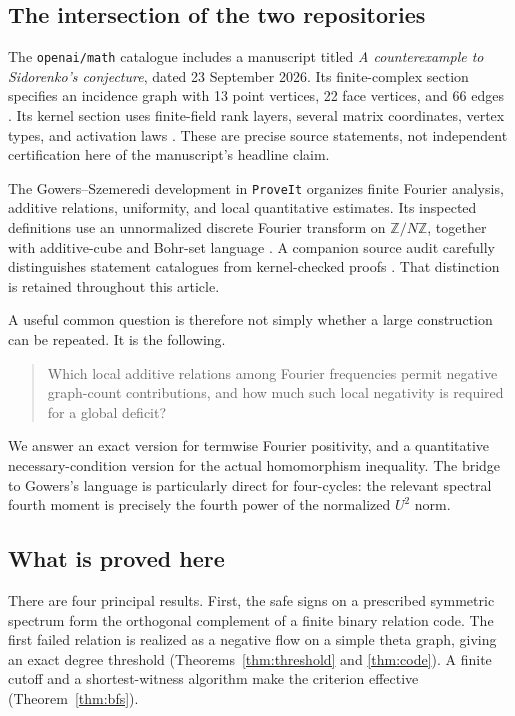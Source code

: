\documentclass[11pt]{article}
\numberwithin{equation}{section}
\theoremstyle{definition}
\theoremstyle{remark}
\newcommand{\Z}{\mathbb Z}
\begin{document}
\subsection{The intersection of the two repositories}

The \texttt{openai/math} catalogue includes a manuscript titled
\emph{A counterexample to Sidorenko's conjecture}, dated 23 September 2026.
Its finite-complex section specifies an incidence graph with 13 point
vertices, 22 face vertices, and 66 edges \cite{OpenAICatalogue,OpenAIComplex}.
Its kernel section uses finite-field rank layers, several matrix
coordinates, vertex types, and activation laws \cite{OpenAIKernel}.
These are precise source statements, not independent certification here
of the manuscript's headline claim.

The Gowers--Szemeredi development in \texttt{ProveIt} organizes finite
Fourier analysis, additive relations, uniformity, and local quantitative
estimates. Its inspected definitions use an unnormalized discrete Fourier
transform on $\Z/N\Z$, together with additive-cube and Bohr-set language
\cite{ProveItDefinitions}. A companion source audit carefully distinguishes
statement catalogues from kernel-checked proofs \cite{ProveItAudit}.
That distinction is retained throughout this article.

A useful common question is therefore not simply whether a large
construction can be repeated. It is the following.

\begin{quote}
Which local additive relations among Fourier frequencies permit negative
graph-count contributions, and how much such local negativity is required
for a global deficit?
\end{quote}

We answer an exact version for termwise Fourier positivity, and a
quantitative necessary-condition version for the actual homomorphism
inequality. The bridge to Gowers's language is particularly direct for
four-cycles: the relevant spectral fourth moment is precisely the fourth
power of the normalized $U^2$ norm.

\subsection{What is proved here}

There are four principal results. First, the safe signs on a prescribed
symmetric spectrum form the orthogonal complement of a finite binary
relation code. The first failed relation is realized as a negative flow
on a simple theta graph, giving an exact degree threshold
(Theorems~\ref{thm:threshold} and \ref{thm:code}). A finite cutoff and a
shortest-witness algorithm make the criterion effective
(Theorem~\ref{thm:bfs}).
\end{document}

